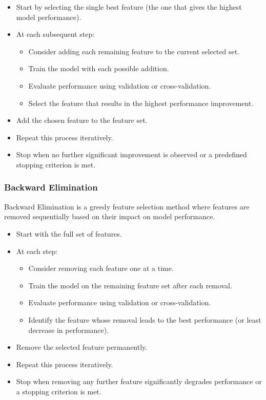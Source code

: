 \documentclass[10pt,a4paper]{article}
\begin{document}
	\begin{itemize}
	    \item Start by selecting the single best feature (the one that gives the highest model performance).
	    \item At each subsequent step:
	    \begin{itemize}
	        \item Consider adding each remaining feature to the current selected set.
	        \item Train the model with each possible addition.
	        \item Evaluate performance using validation or cross-validation.
	        \item Select the feature that results in the highest performance improvement.
	    \end{itemize}
	    \item Add the chosen feature to the feature set.
	    \item Repeat this process iteratively.
	    \item Stop when no further significant improvement is observed or a predefined stopping criterion is met.
	\end{itemize}

	\subsubsection{Backward Elimination}
	
	Backward Elimination is a greedy feature selection method where features are removed sequentially based on their impact on model performance.
	
	\begin{itemize}
	    \item Start with the full set of features.
	    \item At each step:
	    \begin{itemize}
	        \item Consider removing each feature one at a time.
	        \item Train the model on the remaining feature set after each removal.
	        \item Evaluate performance using validation or cross-validation.
	        \item Identify the feature whose removal leads to the best performance (or least decrease in performance).
	    \end{itemize}
	    \item Remove the selected feature permanently.
	    \item Repeat this process iteratively.
	    \item Stop when removing any further feature significantly degrades performance or a stopping criterion is met.
	\end{itemize}
\end{document}
